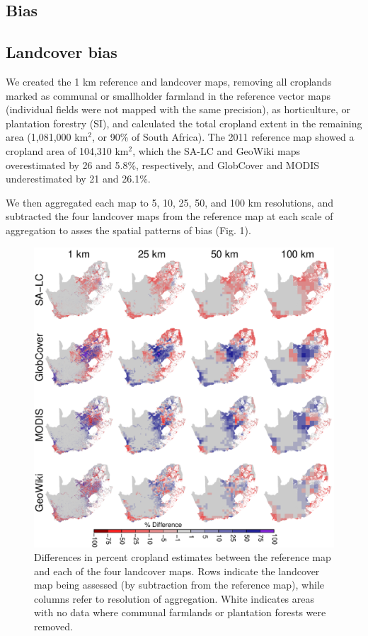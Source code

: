 \documentclass{pnastwo}
\begin{document}
\begin{article}
\vspace{-0.5 cm}
\section{Bias}
\subsection{Landcover bias}

We created the 1 km reference and landcover maps, removing all croplands marked as communal or smallholder farmland in the reference vector maps (individual fields were not mapped with the same precision), as horticulture, or plantation forestry (SI), and calculated the total cropland extent in the remaining area (1,081,000 km$^2$, or 90\% of South Africa).  The 2011 reference map showed a cropland area of 104,310 km$^2$, which the SA-LC and GeoWiki maps overestimated by 26 and 5.8\%, respectively, and GlobCover and MODIS underestimated by 21 and 26.1\%.  

We then aggregated each map to 5, 10, 25, 50, and 100 km resolutions, and subtracted the four landcover maps from the reference map at each scale of aggregation to asses the spatial patterns of bias (Fig. 1). 

\vspace{-0.25 cm}
\begin{figure}[ht]
\centerline{\includegraphics[width=.5\textwidth]{figures/bias_map.pdf}}
\caption{Differences in percent cropland estimates between the reference map and each of the four landcover maps. Rows indicate the landcover map being assessed (by subtraction from the reference map), while columns refer to resolution of aggregation. White indicates areas with no data where communal farmlands or plantation forests were removed.}\label{afoto}
\end{figure}


\end{article}
\end{document}
